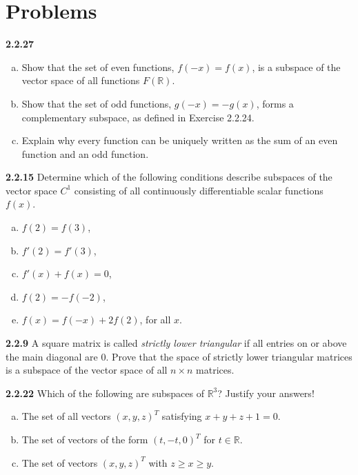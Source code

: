\documentclass{article}
\begin{document}
\section*{Problems}

\textbf{2.2.27}
\begin{enumerate}[(a)]
    \item Show that the set of even functions, \(f(-x) = f(x)\), is a subspace of the vector space of all functions \(F(\mathbb{R})\).
    \item Show that the set of odd functions, \(g(-x) = -g(x)\), forms a complementary subspace, as defined in Exercise 2.2.24.
    \item Explain why every function can be uniquely written as the sum of an even function and an odd function.
\end{enumerate}
\vspace{10pt}

\textbf{2.2.15}
Determine which of the following conditions describe subspaces of the vector space \(C^1\) consisting of all continuously differentiable scalar functions \(f(x)\).
\begin{enumerate}[(a)]
    \item \(f(2) = f(3)\),
    \item \(f'(2) = f'(3)\),
    \item \(f'(x) + f(x) = 0\),
    \item \(f(2) = -f(-2)\),
    \item \(f(x) = f(-x) + 2f(2)\), for all \(x\).
\end{enumerate}
\vspace{10pt}

\textbf{2.2.9}
A square matrix is called \textit{strictly lower triangular} if all entries on or above the main diagonal are 0. Prove that the space of strictly lower triangular matrices is a subspace of the vector space of all \(n \times n\) matrices.
\vspace{10pt}

\textbf{2.2.22}
Which of the following are subspaces of \(\mathbb{R}^3\)? Justify your answers!
\begin{enumerate}[(a)]
    \item The set of all vectors \((x, y, z)^T\) satisfying \(x + y + z + 1 = 0\).
    \item The set of vectors of the form \((t, -t, 0)^T\) for \(t \in \mathbb{R}\).
    \item The set of vectors \((x, y, z)^T\) with \(z \geq x \geq y\).
\end{enumerate}
\vspace{10pt}
\end{document}
